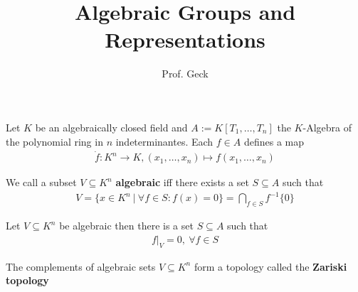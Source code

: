 \documentclass[]{article}
\title{Algebraic Groups and Representations}
\author{Prof. Geck}
\begin{document}
\maketitle


Let \(K\) be an algebraically closed field and \(A:=K[T_1, \dots, T_n]\) the \(K\)-Algebra of the polynomial ring
in \(n\) indeterminantes. Each \(f \in A\) defines a map
\begin{align*}
    \dot{f}:K^n \rightarrow K, (x_1, \dots, x_n) \mapsto f(x_1, \dots, x_n)
\end{align*}

\begin{definition}
    We call a subset \(V \subseteq K^n\) \textbf{algebraic} iff there exists a set \(S \subseteq A\) such that
    \begin{align*}
        V=\{x \in K^n \ \vert \ \forall f \in S: f(x)=0\} = \bigcap_{f \in S} f^{-1}\{0\}
    \end{align*}
\end{definition}

\begin{remark*}
    Let \(V \subseteq K^n\) be algebraic then 
there is a set \(S \subseteq A\) such that
            \begin{align*}
                f |_V = 0, \ \forall f \in S
            \end{align*}

\end{remark*}

\begin{theorem*}
    The complements of algebraic sets \(V \subseteq K^n\) form a topology called the \textbf{Zariski topology}
\end{theorem*}
\end{document}
